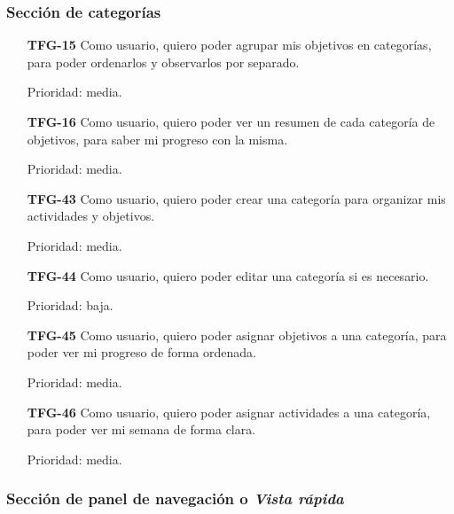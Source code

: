 \documentclass[10pt, a4paper]{aqademic}
\begin{document}
\subsubsection*{Sección de categorías}

\begin{itemize}[leftmargin=16mm]
	\item [\textbf{TFG-15}] Como usuario, quiero poder agrupar mis objetivos en categorías, para poder ordenarlos y observarlos por separado.
	
	Prioridad: media.
	
	\item [\textbf{TFG-16}] Como usuario, quiero poder ver un resumen de cada categoría de objetivos, para saber mi progreso con la misma.
	
	Prioridad: media.
	
	\item [\textbf{TFG-43}] Como usuario, quiero poder crear una categoría para organizar mis actividades y objetivos.
	
	Prioridad: media.
	
	
	\item [\textbf{TFG-44}] Como usuario, quiero poder editar una categoría si es necesario.
	
	Prioridad: baja.
	
	\item [\textbf{TFG-45}] Como usuario, quiero poder asignar objetivos a una categoría, para poder ver mi progreso de forma ordenada.
	
	Prioridad: media.
	
	\item [\textbf{TFG-46}] Como usuario, quiero poder asignar actividades a una categoría, para poder ver mi semana de forma clara.
	
	Prioridad: media.
\end{itemize}

\subsubsection*{Sección de panel de navegación o \textit{Vista rápida}}
\end{document}
